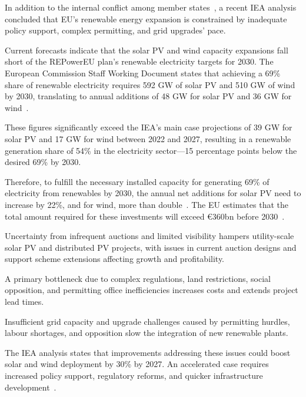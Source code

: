 In addition to the internal conflict among member states~\cite{eu2023energycritique}, a recent IEA analysis concluded that EU's renewable energy expansion is constrained by inadequate policy support, complex permitting, and grid upgrades' pace.~\cite{iea2022renewables}

Current forecasts indicate that the solar PV and wind capacity expansions fall short of the REPowerEU plan's renewable electricity targets for 2030. The European Commission Staff Working Document states that achieving a 69\% share of renewable electricity requires 592 GW of solar PV and 510 GW of wind by 2030, translating to annual additions of 48 GW for solar PV and 36 GW for wind~\cite{eu2022repowerWD}. 

These figures significantly exceed the IEA's main case projections of 39 GW for solar PV and 17 GW for wind between 2022 and 2027, resulting in a renewable generation share of 54\% in the electricity sector—15 percentage points below the desired 69\% by 2030. 

Therefore, to fulfill the necessary installed capacity for generating 69\% of electricity from renewables by 2030, the annual net additions for solar PV need to increase by 22\%, and for wind, more than double~\cite{iea2022repower}. The EU estimates that the total amount required for these investments will exceed €360bn before 2030~\cite{eu2022repowerWD}.


\begin{description}[style=nextline]
    \item[Policy Support:] Uncertainty from infrequent auctions and limited visibility hampers utility-scale solar PV and distributed PV projects, with issues in current auction designs and support scheme extensions affecting growth and profitability.
    \item[Permitting:] A primary bottleneck due to complex regulations, land restrictions, social opposition, and permitting office inefficiencies increases costs and extends project lead times.
    \item[Grid Congestion:] Insufficient grid capacity and upgrade challenges caused by permitting hurdles, labour shortages, and opposition slow the integration of new renewable plants.
\end{description}

The IEA analysis states that improvements addressing these issues could boost solar and wind deployment by 30\% by 2027. An accelerated case requires increased policy support, regulatory reforms, and quicker infrastructure development~\cite{iea2022repower}.

